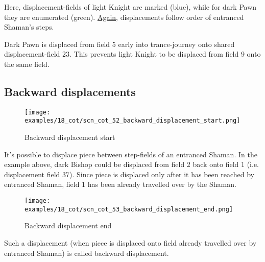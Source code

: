 Here, displacement-fields of light Knight are marked (blue), while for dark Pawn
they are enumerated (green).
\hyperref[fig:scn_cot_43_light_light_shaman_interaction_end]{Again}, displacements
follow order of entranced Shaman's steps.

Dark Pawn is displaced from field 5 early into trance-journey onto shared
displacement-field 23. This prevents light Knight to be displaced from field 9
onto the same field.

\clearpage %

\subsection*{Backward displacements}
\label{sec:Conquest of Tlalocan/Trance-journey/Backward displacements}

\noindent
\begin{figure}[!h]
\vspace{-1.0\baselineskip}
\texttt{[image: examples/18\_cot/scn\_cot\_52\_backward\_displacement\_start.png]}
\caption{Backward displacement start}
\label{fig:scn_cot_52_backward_displacement_start}
\end{figure}

It's possible to displace piece between step-fields of an entranced Shaman. In the
example above, dark Bishop could be displaced from field 2 back onto field 1 (i.e.
displacement field 37). Since piece is displaced only after it has been reached by
entranced Shaman, field 1 has been already travelled over by the Shaman.

\clearpage %

\noindent
\begin{figure}[!h]
\texttt{[image: examples/18\_cot/scn\_cot\_53\_backward\_displacement\_end.png]}
\caption{Backward displacement end}
\label{fig:scn_cot_53_backward_displacement_end}
\end{figure}

Such a displacement (when piece is displaced onto field already travelled over
by entranced Shaman) is called backward displacement.

